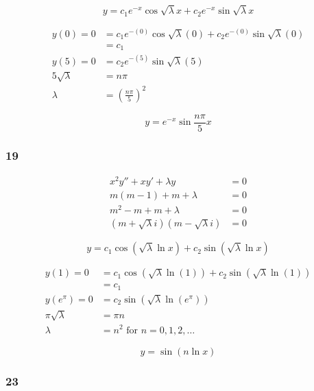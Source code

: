 \documentclass{article}
\begin{document}
\[y = c_1 e^{-x} \cos \sqrt \lambda x + c_2 e^{-x} \sin \sqrt \lambda x\]

\begin{align*}
  y(0) = 0        & = c_1 e^{-(0)} \cos \sqrt \lambda (0) + c_2 e^{-(0)} \sin \sqrt \lambda (0) \\
                  & = c_1                                                                       \\
  y(5) = 0        & = c_2 e^{-(5)} \sin \sqrt \lambda (5)                                       \\
  5 \sqrt \lambda & = n \pi                                                                     \\
  \lambda         & = \left( \frac{n \pi}{5} \right)^2
\end{align*}

\[y = e^{-x} \sin \frac{n \pi}{5} x\]

\subsubsection{19}

\begin{align*}
  x^2 y'' + x y' + \lambda y                  & = 0 \\
  m (m - 1) + m + \lambda                     & = 0 \\
  m^2 - m + m + \lambda                       & = 0 \\
  (m + \sqrt \lambda i) (m - \sqrt \lambda i) & = 0
\end{align*}

\[y = c_1 \cos (\sqrt \lambda \ln x) + c_2 \sin (\sqrt \lambda \ln x)\]

\begin{align*}
  y(1) = 0          & = c_1 \cos (\sqrt \lambda \ln (1)) + c_2 \sin (\sqrt \lambda \ln (1)) \\
                    & = c_1                                                                 \\
  y(e^\pi) = 0      & = c_2 \sin (\sqrt \lambda \ln (e^\pi))                                \\
  \pi \sqrt \lambda & = \pi n                                                               \\
  \lambda           & = n^2 \text{ for } n = 0, 1, 2, \ldots
\end{align*}

\[y = \sin (n \ln x)\]

\subsubsection{23}
\end{document}
